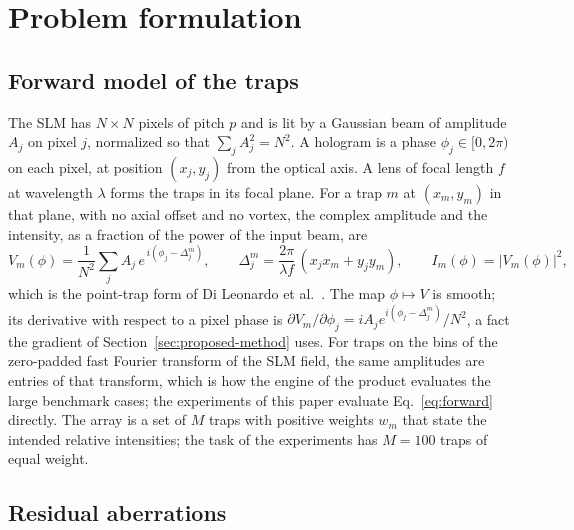 \section{Problem formulation}\label{sec:problem}

\subsection{Forward model of the traps}

The SLM has $N\times N$ pixels of pitch $p$ and is lit by a Gaussian beam of amplitude $A_j$ on pixel $j$, normalized so that $\sum_jA_j^2=N^2$. A hologram is a phase $\phi_j\in[0,2\pi)$ on each pixel, at position $(x_j,y_j)$ from the optical axis.
A lens of focal length $f$ at wavelength $\lambda$ forms the traps in its focal plane. For a trap $m$ at $(x_m,y_m)$ in that plane, with no axial offset and no vortex, the complex amplitude and the intensity, as a fraction of the power of the input beam, are
\begin{equation}
V_m(\phi)=\frac1{N^2}\sum_jA_j\,e^{\,i(\phi_j-\Delta_j^m)},\qquad \Delta_j^m=\frac{2\pi}{\lambda f}\,(x_jx_m+y_jy_m),\qquad I_m(\phi)=|V_m(\phi)|^2,\label{eq:forward}
\end{equation}
which is the point-trap form of Di Leonardo et al.~\cite{dileonardo2007}. The map $\phi\mapsto V$ is smooth; its derivative with respect to a pixel phase is $\partial V_m/\partial\phi_j=iA_je^{i(\phi_j-\Delta_j^m)}/N^2$, a fact the gradient of Section~\ref{sec:proposed-method} uses.
For traps on the bins of the zero-padded fast Fourier transform of the SLM field, the same amplitudes are entries of that transform, which is how the engine of the product evaluates the large benchmark cases; the experiments of this paper evaluate Eq.~\eqref{eq:forward} directly.
The array is a set of $M$ traps with positive weights $w_m$ that state the intended relative intensities; the task of the experiments has $M=100$ traps of equal weight.

\subsection{Residual aberrations}

